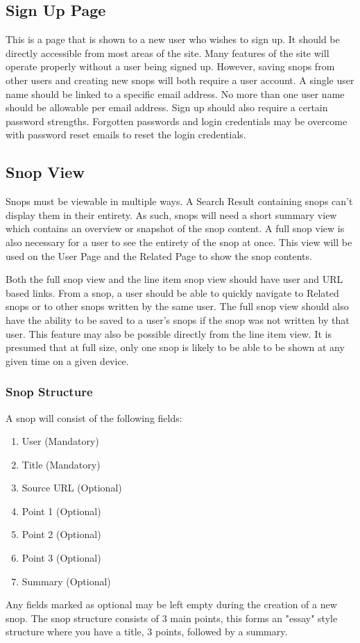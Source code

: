 \documentclass[11pt]{article}
\begin{document}
\subsection{Sign Up Page}
This is a page that is shown to a new user who wishes to sign up. It should be directly accessible from most areas of the site. Many features of the site will operate properly without a user being signed up. However, saving snops from other users and creating new snops will both require a user account. A single user name should be linked to a specific email address. No more than one user name should be allowable per email address. Sign up should also require a certain password strengths. Forgotten passwords and login credentials may be overcome with password reset emails to reset the login credentials.
\subsection{Snop View}
Snops must be viewable in multiple ways. A Search Result containing snops can't display them in their entirety. As such, snops will need a short summary view which contains an overview or snapshot of the snop content. A full snop view is also necessary for a user to see the entirety of the snop at once. This view will be used on the User Page and the Related Page to show the snop contents. 

Both the full snop view and the line item snop view should have user and URL based links. From a snop, a user should be able to quickly navigate to Related snops or to other snops written by the same user. The full snop view should also have the ability to be saved to a user's snops if the snop was not written by that user. This feature may also be possible directly from the line item view. It is presumed that at full size, only one snop is likely to be able to be shown at any given time on a given device.
\subsubsection{Snop Structure}
\label{sec:snop_structure}
A snop will consist of the following fields:
\begin{enumerate}
\item User (Mandatory)
\item Title (Mandatory)
\item Source URL (Optional)
\item Point 1 (Optional)
\item Point 2 (Optional)
\item Point 3 (Optional)
\item Summary (Optional)
\end{enumerate}
Any fields marked as optional may be left empty during the creation of a new snop. The snop structure consists of 3 main points, this forms an "essay" style structure where you have a title, 3 points, followed by a summary.
\end{document}
